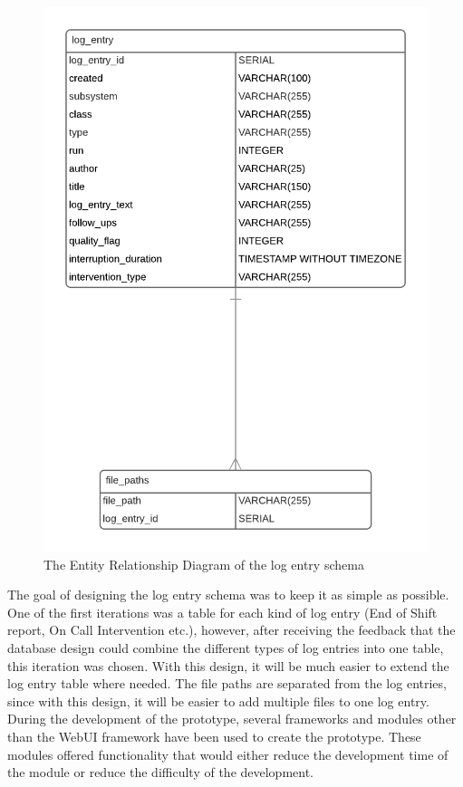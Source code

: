 \documentclass[paper=a4, fontsize=11pt,twoside]{scrartcl}	%
\begin{document}
\begin{figure}[H]
\centering
\includegraphics[scale=0.9]{erd_log_entry}
\caption{The Entity Relationship Diagram of the log entry schema}
\end{figure}
\noindent
The goal of designing the log entry schema was to keep it as simple as possible. One of the first iterations was a table for each kind of log entry (End of Shift report, On Call Intervention etc.), however, after receiving the feedback that the database design could combine the different types of log entries into one table, this iteration was chosen. With this design, it will be much easier to extend the log entry table where needed. The file paths are separated from the log entries, since with this design, it will be easier to add multiple files to one log entry. \\ 
During the development of the prototype, several frameworks and modules other than the WebUI framework have been used to create the prototype. These modules offered functionality that would either reduce the development time of the module or reduce the difficulty of the development. \\ \\
\end{document}
